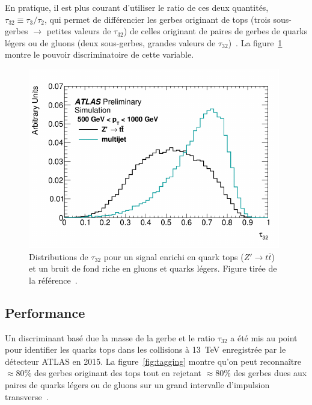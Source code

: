 En pratique, il est plus courant d'utiliser le ratio de ces deux
quantités, $\tau_{32}\equiv\tau_3/\tau_2$, qui permet de différencier
les gerbes originant de tops (trois sous-gerbes $\rightarrow$ petites
valeurs de $\tau_{32}$) de celles originant de paires de gerbes de
quarks légers ou de gluons (deux sous-gerbes, grandes valeurs de
$\tau_{32}$)~\cite{_boosted_2015}. La figure~\ref{fig:nsubj} montre le
pouvoir discriminatoire de cette variable.

\begin{figure}
  \centering
  \includegraphics[width=.5\textwidth]{nsubj.pdf}
  \caption{Distributions de $\tau_{32}$ pour un signal enrichi en
    quark tops ($Z' \rightarrow t\overline{t}$) et un bruit de fond
    riche en gluons et quarks légers. Figure tirée de la
    référence~\cite{_boosted_2015}.}
  \label{fig:nsubj}
\end{figure}

\subsection{Performance}
\label{sec:top:sous_structure:perf}

Un discriminant basé due la masse de la gerbe et le ratio $\tau_{32}$
a été mis au point pour identifier les quarks tops dans les collisions
à 13~TeV enregistrée par le détecteur ATLAS en 2015. La
figure~\ref{fig:tagging} montre qu'on peut reconnaître $\approx 80\%$
des gerbes originant des tops tout en rejetant $\approx 80\%$ des
gerbes dues aux paires de quarks légers ou de gluons sur un grand
intervalle d'impulsion transverse~\cite{_boosted_2015}.

